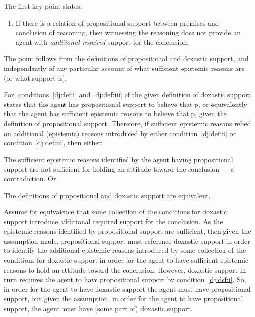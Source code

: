 \begin{note}
  The first key point states:
  \begin{enumerate}
  \item If there is a relation of propositional support between premises and conclusion of reasoning, then witnessing the reasoning does not provide an agent with \emph{additional required} support for the conclusion.
  \end{enumerate}
  The point follows from the definitions of propositional and doxastic support, and independently of any particular account of what sufficient epistemic reasons are (or what support is).

  For, conditions~\ref{dj:def:i} and~\ref{dj:def:iii} of the given definition of doxastic support states that the agent has propositional support to believe that p, or equivalently that the agent has sufficient epistemic reasons to believe that p, given the definition of propositional support.
  Therefore, if sufficient epistemic reasons relied on additional (epistemic) reasons introduced by either condition~\ref{dj:def:ii} or condition~\ref{dj:def:iii}, then either:
  \begin{enumerate*}[label=(\roman*)]
  \item The sufficient epistemic reasons identified by the agent having propositional support are not sufficient for holding an attitude toward the conclusion --- a contradiction.
    Or
  \item The definitions of propositional and doxastic support are equivalent.
  \end{enumerate*}

  Assume for equivalence that some collection of the conditions for doxastic support introduce additional required support for the conclusion.
  As the epistemic reasons identified by propositional support are sufficient, then given the assumption made, propositional support must reference doxastic support in order to identify the additional epistemic reasons introduced by some collection of the conditions for doxastic support in order for the agent to have sufficient epistemic reasons to hold an attitude toward the conclusion.
  However, doxastic support in turn requires the agent to have propositional support by condition~\ref{dj:def:i}.
  So, in order for the agent to have doxastic support the agent must have propositional support, but given the assumption, in order for the agent to have propositional support, the agent must have (some part of) doxastic support.


\end{note}
